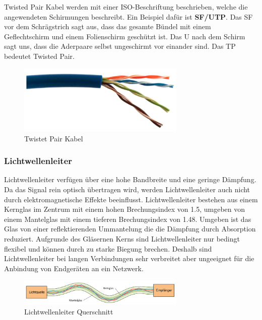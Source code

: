 \documentclass{article}
\begin{document}
Twisted Pair Kabel werden mit einer ISO-Beschriftung beschrieben, welche die angewendeten Schirmungen beschreibt. Ein Beispiel dafür ist \textbf{SF/UTP}. Das SF vor dem Schrägstrich sagt aus, dass das gesamte Bündel mit einem Geflechtschirm und einem Folienschirm geschützt ist. Das U nach dem Schirm sagt uns, dass die Aderpaare selbst ungeschirmt vor einander sind. Das TP bedeutet Twisted Pair. 
\begin{figure}[h!]
		\begin{center}
		\includegraphics[width=8cm]{img/tp.png}
		\end{center}
		\caption{Twistet Pair Kabel}
		\label{fig:Twistet Pair Kabel}
\end{figure}
\subsubsection{Lichtwellenleiter}
Lichtwellenleiter verfügen über eine hohe Bandbreite und eine geringe Dämpfung. Da das Signal rein optisch übertragen wird, werden Lichtwellenleiter auch nicht durch elektromagnetische Effekte beeinflusst. Lichtwellenleiter bestehen aus einem Kernglas im Zentrum mit einem hohen Brechungsindex von 1.5, umgeben von einem Mantelglas mit einem tieferen Brechungsindex von 1.48. Umgeben ist das Glas von einer reflektierenden Ummantelung die die Dämpfung durch Absorption reduziert. Aufgrunde des Gläsernen Kerns sind Lichtwellenleiter nur bedingt flexibel und können durch zu starke Biegung brechen. Deshalb sind Lichtwellenleiter bei langen Verbindungen sehr verbreitet aber ungeeignet für die Anbindung von Endgeräten an ein Netzwerk.
\begin{figure}[h!]
		\begin{center}
		\includegraphics[width=8cm]{img/lwl2.png}
		\end{center}
		\caption{Lichtwellenleiter Querschnitt}
		\label{fig:Lichtwellenleiter Querschnitt}
\end{figure}
\end{document}

